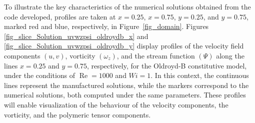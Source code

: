 \documentclass[preprint, 12pt]{elsarticle}
\begin{document}
To illustrate the key characteristics of the numerical solutions obtained from
the code developed, profiles are taken at $x=0.25$, $x=0.75$, $y=0.25$, and
$y=0.75$, marked red and blue, respectively, in Figure~\ref{fig_domain}.
Figures \ref{fig_slice_Solution_uvwzpsi_oldroydb_x} and
\ref{fig_slice_Solution_uvwzpsi_oldroydb_y} display profiles of the velocity
field components $(u, v)$, vorticity $(\omega_z)$, and the stream function
$(\Psi)$ along the lines $x=0.25$ and $y=0.75$, respectively, for the Oldroyd-B
constitutive model, under the conditions of $\operatorname{Re}=1000$ and
$Wi=1$. In this context, the continuous lines represent the manufactured
solutions, while the markers correspond to the numerical solutions, both
computed under the same parameters. These profiles will enable visualization of
the behaviour of the velocity components, the vorticity, and the polymeric
tensor components.
\end{document}
